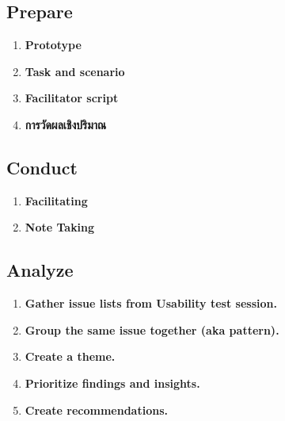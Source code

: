 \subsection{Prepare}
\begin{enumerate}
    \item \textbf{Prototype}
    \item \textbf{Task and scenario}
    \item \textbf{Facilitator script}
    \item \textbf{การวัดผลเชิงปริมาณ}
\end{enumerate}
\subsection{Conduct}
\begin{enumerate}
    \item \textbf{Facilitating}
    \item \textbf{Note Taking}
\end{enumerate}
\subsection{Analyze}
\begin{enumerate}
    \item \textbf{Gather issue lists from Usability test session.}
    \item \textbf{Group the same issue together (aka pattern).}
    \item \textbf{Create a theme.}
    \item \textbf{Prioritize findings and insights.}
    \item \textbf{Create recommendations.}
\end{enumerate}
